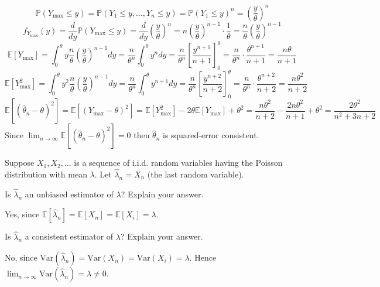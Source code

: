 \documentclass{article}
\newcommand{\E}{\mathbb{E}}
\newcommand{\V}{\text{Var}}
\renewcommand{\P}{\mathbb{P}}
\begin{document}
\begin{probset}
\begin{prob}
\begin{soln}
        \[
            \P(Y_{\max} \leq y) = \P(Y_1 \leq y, \dots, Y_n \leq y) = \P(Y_1 \leq y)^n = \left(\frac{y}{\theta}\right)^n
        \]
        \[
            f_{Y_{\max}}(y) = \frac{d}{dy} \P(Y_{\max} \leq y) = \frac{d}{dy} \left(\frac{y}{\theta}\right)^n = n\left(\frac{y}{\theta}\right)^{n-1} \cdot \frac{1}{\theta} = \frac{n}{\theta} \left(\frac{y}{\theta}\right)^{n-1}
        \]
        \[
            \E[Y_{\max}] = \int_0^\theta y \frac{n}{\theta} \left(\frac{y}{\theta}\right)^{n-1} dy = \frac{n}{\theta^n} \int_0^\theta y^n dy = \frac{n}{\theta^n} \left[\frac{y^{n+1}}{n+1}\right]_0^\theta = \frac{n}{\theta^n} \cdot \frac{\theta^{n+1}}{n+1} = \frac{n\theta}{n+1}
        \]
        \[
            \E[Y_{\max}^2] = \int_0^\theta y^2 \frac{n}{\theta} \left(\frac{y}{\theta}\right)^{n-1} dy = \frac{n}{\theta^n} \int_0^\theta y^{n+1} dy = \frac{n}{\theta^n} \left[\frac{y^{n+2}}{n+2}\right]_0^\theta = \frac{n}{\theta^n} \cdot \frac{\theta^{n+2}}{n+2} = \frac{n\theta^2}{n+2}
        \]
        \[
            \E[(\hat\theta_n - \theta)^2] = \E[(Y_{\max} - \theta)^2] = \E[Y_{\max}^2] - 2\theta\E[Y_{\max}] + \theta^2 = \frac{n\theta^2}{n+2} - \frac{2n\theta^2}{n+1} + \theta^2 = \frac{2\theta^2}{n^2+3n+2}
        \]
        Since $\lim_{n \to \infty} \E[(\hat\theta_n - \theta)^2] = 0$ then $\hat\theta_n$ is squared-error consistent.
    \end{soln}
\end{prob}

\begin{prob}
    Suppose $X_1, X_2, \dots$ is a sequence of i.i.d. random variables having the Poisson distribution with mean $\lambda$. Let $\hat\lambda_n = X_n$ (the last random variable).

    \begin{subprobset}
    \begin{subprob}
        Is $\hat\lambda_n$ an unbiased estimator of $\lambda$? Explain your answer.

        \begin{soln}
            Yes, since $\E[\hat\lambda_n] = \E[X_n] = \E[X_i] = \lambda$.
        \end{soln}
    \end{subprob}

    \begin{subprob}
        Is $\hat\lambda_n$ a consistent estimator of $\lambda$? Explain your answer.

        \begin{soln}
            No, since $\V(\hat\lambda_n) = \V(X_n) = \V(X_i) = \lambda$. Hence $\lim_{n \to \infty} \V(\hat\lambda_n) = \lambda \neq 0$.
        \end{soln}
    \end{subprob}
    \end{subprobset}
\end{prob}


\end{probset}
\end{document}
